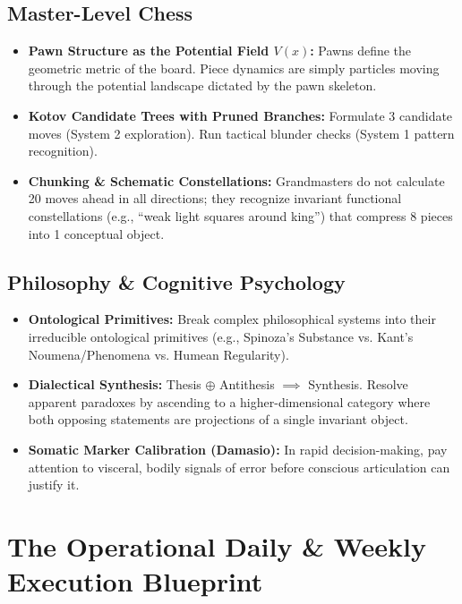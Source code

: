 \documentclass[11pt,a4paper]{article}
\begin{document}
\subsection{Master-Level Chess}
\begin{itemize}
    \item \textbf{Pawn Structure as the Potential Field $V(x)$:} Pawns define the geometric metric of the board. Piece dynamics are simply particles moving through the potential landscape dictated by the pawn skeleton.
    \item \textbf{Kotov Candidate Trees with Pruned Branches:} Formulate 3 candidate moves (System 2 exploration). Run tactical blunder checks (System 1 pattern recognition).
    \item \textbf{Chunking \& Schematic Constellations:} Grandmasters do not calculate 20 moves ahead in all directions; they recognize invariant functional constellations (e.g., ``weak light squares around king'') that compress 8 pieces into 1 conceptual object.
\end{itemize}

\subsection{Philosophy \& Cognitive Psychology}
\begin{itemize}
    \item \textbf{Ontological Primitives:} Break complex philosophical systems into their irreducible ontological primitives (e.g., Spinoza's Substance vs. Kant's Noumena/Phenomena vs. Humean Regularity).
    \item \textbf{Dialectical Synthesis:} Thesis $\oplus$ Antithesis $\implies$ Synthesis. Resolve apparent paradoxes by ascending to a higher-dimensional category where both opposing statements are projections of a single invariant object.
    \item \textbf{Somatic Marker Calibration (Damasio):} In rapid decision-making, pay attention to visceral, bodily signals of error before conscious articulation can justify it.
\end{itemize}

\section{The Operational Daily \& Weekly Execution Blueprint}
\end{document}
